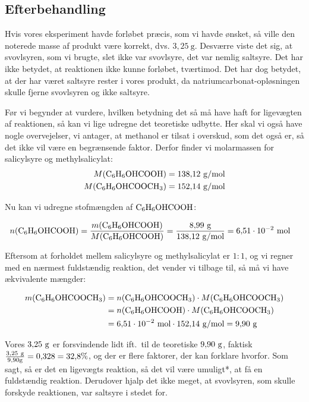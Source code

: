 \subsection*{Efterbehandling}
Hvis vores eksperiment havde forløbet præcis,
som vi havde ønsket, så ville den noterede
masse af produkt være korrekt, dvs. $3{,}25\ \unit{\gram}$.
Desværre viste det sig, at svovlsyren, som vi brugte, slet ikke var svovlsyre,
det var nemlig saltsyre. Det har ikke betydet,
at reaktionen ikke kunne forløbet, tværtimod.
Det har dog betydet, at der har været saltsyre 
rester i vores produkt, da natriumcarbonat-opløsningen
skulle fjerne svovlsyren og ikke saltsyre.

Før vi begynder at vurdere, hvilken betydning
det så må have haft for ligevægten af reaktionen,
så kan vi lige udregne det teoretiske udbytte.
Her skal vi også have nogle overvejelser, vi antager,
at methanol er tilsat i overskud, som det også er,
så det ikke vil være en begrænsende faktor.
Derfor finder vi molarmassen for salicylsyre og
methylsalicylat:
\begin{align*}
    M(\ce{C6H6OHCOOH})&=138{,}12\ \unit{\gram/\mol} \\
    M(\ce{C6H6OHCOOCH3})&=152{,}14\ \unit{\gram/\mol}
\end{align*}

Nu kan vi udregne stofmængden af $\ce{C6H6OHCOOH}$:

\begin{align*}
    n(\ce{C6H6OHCOOH})&=\frac{m(\ce{C6H6OHCOOH})}{
        M(\ce{C6H6OHCOOH})
    }=\frac{8{,}99\ \unit{\gram}}{138{,}12\ \unit{\gram/\mol}}
    =6{,}51 \cdot 10^{-2}\ \unit{\mol}
\end{align*}

Eftersom at forholdet mellem salicylsyre og methylsalicylat er $1:1$,
og vi regner med en nærmest fuldstændig reaktion, det vender vi tilbage til,
så må vi have ækvivalente mængder:

\begin{align*}
    m(\ce{C6H6OHCOOCH3})&=n(\ce{C6H6OHCOOCH3}) \cdot M(\ce{C6H6OHCOOCH3})
    \\
    &=n(\ce{C6H6OHCOOH}) \cdot M(\ce{C6H6OHCOOCH3})
    \\
    &=6{,}51 \cdot 10^{-2}\ \unit{\mol} \cdot 152{,}14\ \unit{\gram/\mol}
    =9{,}90\ \unit{\gram}
\end{align*}

Vores $3{,}25\ \g$ er forsvindende lidt ift.~til de teoretiske $9{,}90\ \g$,
faktisk $\frac{3{,}25\ \g}{9{,}90 \g}=0{,}328=32{,}8\%$,
og der er flere faktorer, der kan forklare hvorfor. Som sagt,
så er det en ligevægts reaktion, så det vil være umuligt*,
at få en fuldstændig reaktion. Derudover hjalp det ikke meget,
at svovlsyren, som skulle forskyde reaktionen, var saltsyre i stedet for.

